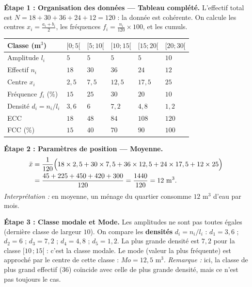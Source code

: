 \documentclass[11pt]{article}
\newcommand{\cle}[1]{{\popxbold\color{popdark}#1}}
\begin{document}
\begin{exoresolu}
\tcblower
\textbf{Étape 1 : Organisation des données — Tableau complété.}
L'effectif total est $N = 18+30+36+24+12 = 120$ : la donnée est cohérente.
On calcule les centres $x_i = \frac{a_i+b_i}{2}$, les fréquences $f_i = \frac{n_i}{120}\times 100$, et les cumuls.

\begin{center}
\begin{tabularx}{\linewidth}{|l|X|X|X|X|X|}\hline
\rowcolor{popblueL} Classe (m$^3$) & $[0;5[$ & $[5;10[$ & $[10;15[$ & $[15;20[$ & $[20;30[$ \\ \hline
Amplitude $l_i$ & $5$ & $5$ & $5$ & $5$ & $10$ \\ \hline
Effectif $n_i$ & $18$ & $30$ & $36$ & $24$ & $12$ \\ \hline
Centre $x_i$ & $2,5$ & $7,5$ & $12,5$ & $17,5$ & $25$ \\ \hline
Fréquence $f_i$ (\%) & $15$ & $25$ & $30$ & $20$ & $10$ \\ \hline
Densité $d_i=n_i/l_i$ & $3,6$ & $6$ & $7,2$ & $4,8$ & $1,2$ \\ \hline
ECC & $18$ & $48$ & $84$ & $108$ & $120$ \\ \hline
FCC (\%) & $15$ & $40$ & $70$ & $90$ & $100$ \\ \hline
\end{tabularx}
\end{center}

\textbf{Étape 2 : Paramètres de position — Moyenne.}
\begin{align*}
\bar{x} &= \frac{1}{120}\Bigl(18\times 2,5 + 30\times 7,5 + 36\times 12,5 + 24\times 17,5 + 12\times 25\Bigr) \\
&= \frac{45 + 225 + 450 + 420 + 300}{120} = \frac{1440}{120} = 12 \text{ m}^3.
\end{align*}
\emph{Interprétation :} en moyenne, un ménage du quartier consomme $12$ m$^3$ d'eau par mois.

\textbf{Étape 3 : Classe modale et Mode.}
Les amplitudes ne sont pas toutes égales (dernière classe de largeur $10$). On compare les \textbf{densités} $d_i = n_i/l_i$ :
$d_1=3,6$ ; $d_2=6$ ; $d_3=7,2$ ; $d_4=4,8$ ; $d_5=1,2$.
La plus grande densité est $7,2$ pour la classe $[10\,;15[$ : c'est la \cle{classe modale}.
Le \cle{mode} (valeur la plus fréquente) est approché par le centre de cette classe : $Mo = 12,5$ m$^3$.
\emph{Remarque :} ici, la classe de plus grand effectif ($36$) coïncide avec celle de plus grande densité, mais ce n'est pas toujours le cas.


\end{exoresolu}
\end{document}
